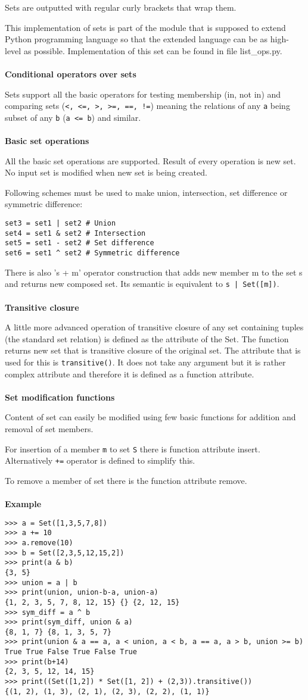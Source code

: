 \documentclass[11pt,oneside]{fithesis2}
\newcommand{\markit}[1]{\ \\\\{\noindent\textbf{#1}}}
\newcommand{\T}[1]{\texttt{#1}}
\begin{document}
Sets are outputted with regular curly brackets that wrap them.

This implementation of sets is part of the module that is supposed to extend Python programming language so that the extended language can be as high-level as possible. Implementation of this set can be found in file list\_ops.py.
\markit{Conditional operators over sets}

Sets support all the basic operators for testing membership (in, not in) and comparing sets (\T{<, <=, >, >=, ==, !=}) meaning the relations of any \T{a} being subset of any \T{b} (\T{a <= b}) and similar.
\markit{Basic set operations}

All the basic set operations are supported. Result of every operation is new set. No input set is modified when new set is being created.

Following schemes must be used to make union, intersection, set difference or symmetric difference:
\begin{lstlisting}
set3 = set1 | set2 # Union
set4 = set1 & set2 # Intersection
set5 = set1 - set2 # Set difference
set6 = set1 ^ set2 # Symmetric difference
\end{lstlisting}

There is also  's + m' operator construction that adds new member m to the set s and returns new composed set. Its semantic is equivalent to \T{s | Set([m])}.
\markit{Transitive closure}

A little more advanced operation of transitive closure of any set containing tuples (the standard set relation) is defined as the attribute of the Set. The function returns new set that is transitive closure of the original set. The attribute that is used for this is \T{transitive()}. It does not take any argument but it is rather complex attribute and therefore it is defined as a function attribute.
\markit{Set modification functions}

Content of set can easily be modified using few basic functions for addition and removal of set members.

For insertion of a member \T{m} to set \T{S} there is function attribute insert. Alternatively \T{+=} operator is defined to simplify this.

To remove a member of set there is the function attribute remove.
\markit{Example}
\begin{lstlisting}
>>> a = Set([1,3,5,7,8])
>>> a += 10
>>> a.remove(10)
>>> b = Set([2,3,5,12,15,2])
>>> print(a & b)
{3, 5}
>>> union = a | b
>>> print(union, union-b-a, union-a)
{1, 2, 3, 5, 7, 8, 12, 15} {} {2, 12, 15}
>>> sym_diff = a ^ b
>>> print(sym_diff, union & a)
{8, 1, 7} {8, 1, 3, 5, 7}
>>> print(union & a == a, a < union, a < b, a == a, a > b, union >= b)
True True False True False True
>>> print(b+14)
{2, 3, 5, 12, 14, 15}
>>> print((Set([1,2]) * Set([1, 2]) + (2,3)).transitive())
{(1, 2), (1, 3), (2, 1), (2, 3), (2, 2), (1, 1)}
\end{lstlisting}
\end{document}
